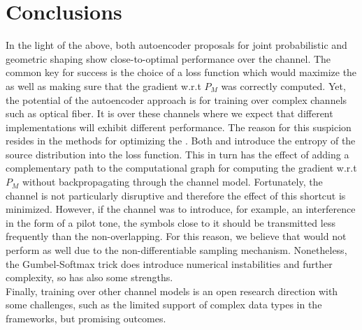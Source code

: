 \chapter{Conclusions}\label{chap:conclusions}

In the light of the above, both autoencoder proposals for joint probabilistic and geometric shaping show close-to-optimal performance over the  channel. The common key for success is the choice of a loss function which would maximize the  as well as making sure that the gradient w.r.t $P_M$ was correctly computed. Yet, the potential of the autoencoder approach is for training over complex channels such as optical fiber. It is over these channels where we expect that different implementations will exhibit different performance. The reason for this suspicion resides in the methods for optimizing the . Both \citep{Aref} and \cite{Stark} introduce the entropy of the source distribution into the loss function. This in turn has the effect of adding a complementary path to the computational graph for computing the gradient w.r.t $P_M$ without backpropagating through the channel model. Fortunately, the  channel is not particularly disruptive and therefore the effect of this shortcut is minimized. However, if the channel was to introduce, for example, an interference in the form of a pilot tone, the symbols close to it should be transmitted less frequently than the non-overlapping. For this reason, we believe that \cite{Aref} would not perform as well due to the non-differentiable sampling mechanism. Nonetheless, the Gumbel-Softmax trick does introduce numerical instabilities and further complexity, so \cite{Aref} has also some strengths.\\
Finally, training over other channel models is an open research direction with some challenges, such as the limited support of complex data types in the  frameworks, but promising outcomes.